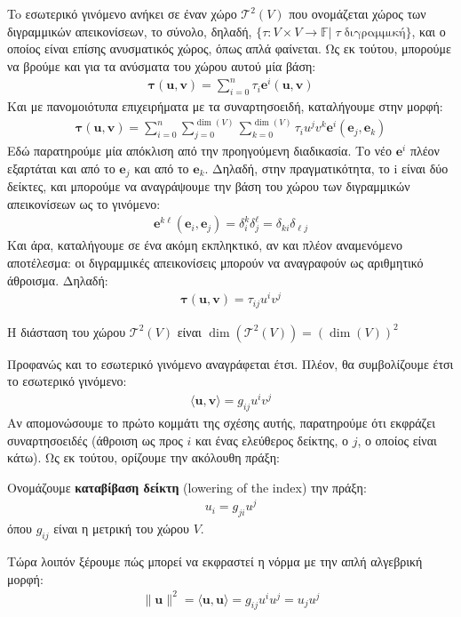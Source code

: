 \documentclass[main.tex]{subfiles}
\begin{document}
	To εσωτερικό γινόμενο ανήκει σε έναν χώρο $\mathcal{T}^2(V)$ που ονομάζεται χώρος των διγραμμικών απεικονίσεων, το σύνολο, δηλαδή, ${\{\tau:V\times V \rightarrow \mathbb{F} | \;\tau \; \text{διγραμμική}\}}$, και ο οποίος είναι επίσης ανυσματικός χώρος, όπως απλά φαίνεται. Ως εκ τούτου, μπορούμε να βρούμε και για τα ανύσματα του χώρου αυτού μία βάση:
	\begin{align*}
		\boldsymbol{\tau}(\boldsymbol{u},\boldsymbol{v}) = \sum^{n}_{i=0}\tau_i\boldsymbol{e}^i(\boldsymbol{u},\boldsymbol{v})
	\end{align*}
	Και με πανομοιότυπα επιχειρήματα με τα συναρτησοειδή, καταλήγουμε στην μορφή:
	\begin{align*}
		\boldsymbol{\tau}(\boldsymbol{u},\boldsymbol{v}) = \sum^{n}_{i=0}\sum^{\dim(V)}_{j=0}\sum_{k=0}^{\dim(V)}\tau_iu^jv^k\boldsymbol{e}^i(\boldsymbol{e}_j,\boldsymbol{e}_k)
	\end{align*}
	Εδώ παρατηρούμε μία απόκλιση από την προηγούμενη διαδικασία. Το νέο $\boldsymbol{e}^i$ πλέον εξαρτάται και από το $\boldsymbol{e}_j$ και από το $\boldsymbol{e}_k$. Δηλαδή, στην πραγματικότητα, το i είναι δύο δείκτες, και μπορούμε να αναγράψουμε την βάση του χώρου των διγραμμικών απεικονίσεων ως το γινόμενο:
	\begin{align*}
		\boldsymbol{e}^{k\ell}(\boldsymbol{e}_i,\boldsymbol{e}_j) = \delta^k_i\delta^\ell_j = \delta_{ki}\delta_{\ell j}
	\end{align*}
	Και άρα, καταλήγουμε σε ένα ακόμη εκπληκτικό, αν και πλέον αναμενόμενο αποτέλεσμα: οι διγραμμικές απεικονίσεις μπορούν να αναγραφούν ως αριθμητικό άθροισμα. Δηλαδή:
	\begin{align*}
		\boldsymbol{\tau}(\boldsymbol{u},\boldsymbol{v}) = \tau_{ij}u^iv^j
	\end{align*}
	\begin{corollary}
		Η διάσταση του χώρου $\mathcal{T}^2(V)$ είναι $\dim(\mathcal{T}^2(V)) = (\dim(V))^2$
	\end{corollary}

	Προφανώς και το εσωτερικό γινόμενο αναγράφεται έτσι. Πλέον, θα συμβολίζουμε έτσι το εσωτερικό γινόμενο:
	\begin{align*}
		\langle\boldsymbol{u},\boldsymbol{v}\rangle = g_{ij}u^iv^j
	\end{align*}
	Αν απομονώσουμε το πρώτο κομμάτι της σχέσης αυτής, παρατηρούμε ότι εκφράζει συναρτησοειδές (άθροιση ως προς $i$ και ένας ελεύθερος δείκτης, ο $j$, ο οποίος είναι κάτω). Ως εκ τούτου, ορίζουμε την ακόλουθη πράξη:
	\begin{definition}
		Ονομάζουμε \textbf{καταβίβαση δείκτη} (lowering of the index) την πράξη:
		\begin{align*}
			u_i = g_{ji}u^j
		\end{align*}
		όπου $g_{ij}$ είναι η μετρική του χώρου $V$.
	\end{definition}
	Τώρα λοιπόν ξέρουμε πώς μπορεί να εκφραστεί η νόρμα με την απλή αλγεβρική μορφή:
	\begin{align*}
		\|\boldsymbol{u}\|^2 = \langle\boldsymbol{u},\boldsymbol{u}\rangle = g_{ij}u^iu^j = u_ju^j
	\end{align*}
\end{document}
